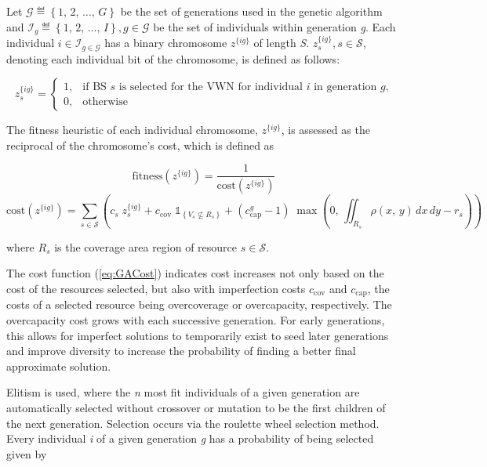 \documentclass[onecolumn,draftcls]{IEEEtran}
\begin{document}
Let $\mathcal{G} \eqdef \left\{1,\, 2,\, \ldots,\, G\right\}$ be the set of generations used in the genetic algorithm and $\mathcal{I}_g \eqdef \left\{1,\, 2,\, \ldots,\, I\right\}, g \in \mathcal{G}$ be the set of individuals within generation \textit{g}.  Each individual $i \in \mathcal{I}_{g \in \mathcal{G}}$ has a binary chromosome $z^{\{ig\}}$ of length \textit{S}.  $z_s^{\{ig\}}, s \in \mathcal{S}$, denoting each individual bit of the chromosome, is defined as follows:

\[ z_s^{\{ig\}} =
	\begin{cases}
		1,& \text{if BS $s$ is selected for the VWN for individual $i$ in generation $g$,}\\
		0,& \text{otherwise}
	\end{cases}
\]

The fitness heuristic of each individual chromosome, $z^{\{ig\}}$, is assessed as the reciprocal of the chromosome's cost, which is defined as

\begin{equation} \label{eq:GAFit}
\text{fitness}\left(z^{\{ig\}}\right) = \frac{1}{\text{cost}\left(z^{\{ig\}}\right)}
\end{equation}
\begin{equation} \label{eq:GACost}
\text{cost}\left(z^{\{ig\}}\right) = \sum_{s \in \mathcal{S}} \left( c_s \; z_s^{\{ig\}} + c_\text{cov} \; \mathbb{1}_{\left\{ V_s \nsubseteq R_s \right\}} + \left(c_\text{cap}^g - 1\right) \; \max\left( 0,\, \iint_{R_s} \rho\left(x,\, y\right)\, dx\, dy - r_s \right) \right)
\end{equation}

\noindent where $R_s$ is the coverage area region of resource $s \in \mathcal{S}$.

The cost function (\ref{eq:GACost}) indicates cost increases not only based on the cost of the resources selected, but also with imperfection costs $c_\text{cov}$ and $c_\text{cap}$, the costs of a selected resource being overcoverage or overcapacity, respectively.  The overcapacity cost grows with each successive generation.  For early generations, this allows for imperfect solutions to temporarily exist to seed later generations and improve diversity to increase the probability of finding a better final approximate solution.

Elitism is used, where the \textit{n} most fit individuals of a given generation are automatically selected without crossover or mutation to be the first children of the next generation.  Selection occurs via the roulette wheel selection method.  Every individual \textit{i} of a given generation \textit{g} has a probability of being selected given by
\end{document}
